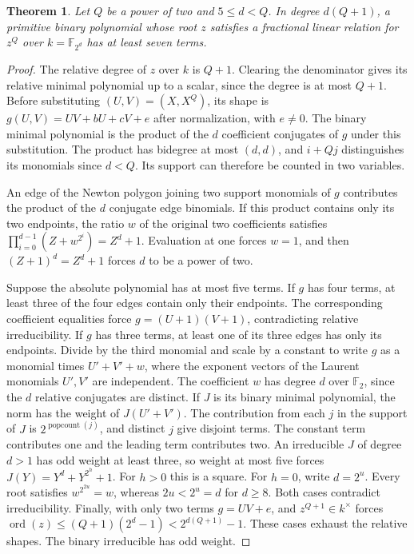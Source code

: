 \documentclass[11pt]{article}
\newtheorem{theorem}{Theorem}
\newcommand{\F}{\mathbb F_2}
\newcommand{\ord}{\operatorname{ord}}
\begin{document}
\begin{theorem}\label{thm:projective-five-obstruction}
Let \(Q\) be a power of two and \(5\le d<Q\). In degree \(d(Q+1)\),
a primitive binary polynomial whose root \(z\) satisfies a fractional
linear relation for \(z^Q\) over \(k=\mathbb F_{2^d}\) has at least
seven terms.
\end{theorem}
\begin{proof}
The relative degree of \(z\) over \(k\) is \(Q+1\). Clearing the
denominator gives its relative minimal polynomial up to a scalar,
since the degree is at most \(Q+1\). Before substituting
\((U,V)=(X,X^Q)\), its shape is
\(g(U,V)=UV+bU+cV+e\) after normalization, with \(e\ne0\).
The binary minimal polynomial is the product of the \(d\) coefficient
conjugates of \(g\) under this substitution. The product has
bidegree at most \((d,d)\), and \(i+Qj\) distinguishes its monomials
since \(d<Q\). Its support can therefore be counted in two variables.

An edge of the Newton polygon joining two support monomials of \(g\)
contributes the product of the \(d\) conjugate edge binomials.
If this product contains only its two endpoints, the ratio \(w\)
of the original two coefficients satisfies
\(\prod_{i=0}^{d-1}(Z+w^{2^i})=Z^d+1\).
Evaluation at one forces \(w=1\), and then \((Z+1)^d=Z^d+1\)
forces \(d\) to be a power of two.

Suppose the absolute polynomial has at most five terms. If \(g\)
has four terms, at least three of the four edges contain only their
endpoints. The corresponding coefficient equalities force
\(g=(U+1)(V+1)\), contradicting relative irreducibility.
If \(g\) has three terms, at least one of its three edges has only
its endpoints. Divide by the third monomial and scale by a constant
to write \(g\) as a monomial times \(U'+V'+w\), where the exponent
vectors of the Laurent monomials \(U',V'\) are independent.
The coefficient \(w\) has degree \(d\) over \(\F\), since the
\(d\) relative conjugates are distinct. If \(J\) is its binary
minimal polynomial, the norm has the weight of \(J(U'+V')\).
The contribution from each \(j\) in the support of \(J\) is
\(2^{\operatorname{popcount}(j)}\), and distinct \(j\) give disjoint
terms. The constant term contributes one and the leading term
contributes two. An irreducible \(J\) of degree \(d>1\) has odd
weight at least three, so weight at most five forces
\(J(Y)=Y^d+Y^{2^h}+1\). For \(h>0\) this is a square. For \(h=0\),
write \(d=2^u\). Every root satisfies \(w^{2^{2u}}=w\), whereas
\(2u<2^u=d\) for \(d\ge8\). Both cases contradict irreducibility.
Finally, with only two terms \(g=UV+e\), and \(z^{Q+1}\in k^\times\)
forces \(\ord(z)\le(Q+1)(2^d-1)<2^{d(Q+1)}-1\). These cases
exhaust the relative shapes. The binary irreducible has odd weight.
\end{proof}
\end{document}

